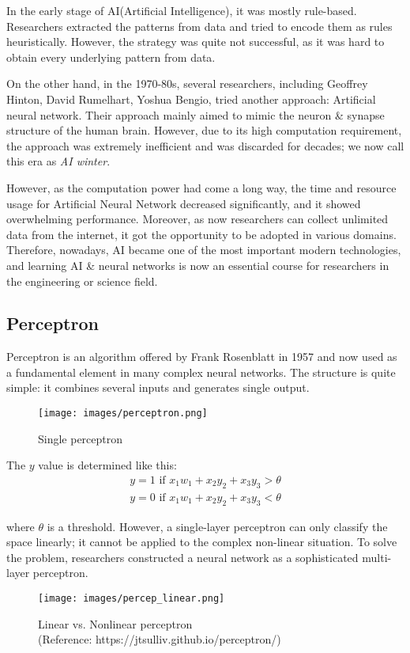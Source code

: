 \documentclass{oblivoir}
\begin{document}
In the early stage of AI(Artificial Intelligence), it was mostly rule-based. Researchers extracted the patterns from data and tried to encode them as rules heuristically. However, the strategy was quite not successful, as it was hard to obtain every underlying pattern from data. 

On the other hand, in the 1970-80s, several researchers, including Geoffrey Hinton, David Rumelhart, Yoshua Bengio, tried another approach: Artificial neural network. Their approach mainly aimed to mimic the neuron \& synapse structure of the human brain. However, due to its high computation requirement, the approach was extremely inefficient and was discarded for decades; we now call this era as \textit{AI winter}.

However, as the computation power had come a long way, the time and resource usage for Artificial Neural Network decreased significantly, and it showed overwhelming performance. Moreover, as now researchers can collect unlimited data from the internet, it got the opportunity to be adopted in various domains. Therefore, nowadays, AI became one of the most important modern technologies, and learning AI \& neural networks is now an essential course for researchers in the engineering or science field. 

\subsection{Perceptron}

Perceptron is an algorithm offered by Frank Rosenblatt in 1957 and now used as a fundamental element in many complex neural networks. The structure is quite simple: it combines several inputs and generates single output. 
\begin{figure}[h]
    \centering
    \texttt{[image: images/perceptron.png]}
    {\caption*{Single perceptron}}
\end{figure}

The $y$ value is determined like this: 
\begin{align*}
    y = 1 \text{ if } x_1w_1 + x_2y_2 + x_3y_3 > \theta \\
    y = 0 \text{ if } x_1w_1 + x_2y_2 + x_3y_3 < \theta
\end{align*}


where $\theta$ is a threshold. However, a single-layer perceptron can only classify the space linearly; it cannot be applied to the complex non-linear situation. To solve the problem, researchers constructed a neural network as a sophisticated multi-layer perceptron. 
\begin{figure}[h]
    \centering
    \texttt{[image: images/percep\_linear.png]}
    {\caption*{Linear vs. Nonlinear perceptron \\ \scriptsize{(Reference: https://jtsulliv.github.io/perceptron/)}}}
\end{figure}
\end{document}
